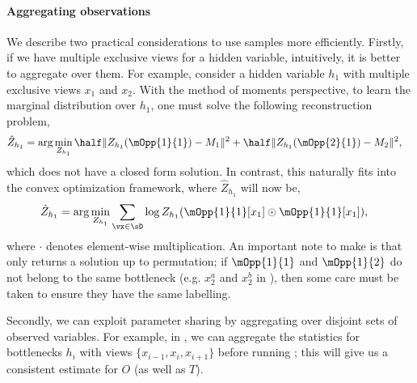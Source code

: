 

\paragraph{Aggregating observations}
We describe two practical considerations to use samples more efficiently.
Firstly, if we have multiple exclusive views for a hidden variable,
  intuitively, it is better to aggregate over them. 
For example, consider a hidden variable $h_1$ with multiple exclusive
  views $x_1$ and $x_2$.
With the method of moments perspective, to learn the marginal
  distribution over $h_1$, one must solve the following reconstruction
  problem, 
\begin{align*}
  \hat Z_{h_1} &= \arg\min_{Z_{h_1}} \half \|Z_{h_1}(\mOpp{1}{1}) - M_1 \|^2 + \half \|Z_{h_1}(\mOpp{2}{1}) - M_2 \|^2,
\end{align*}
which does not have a closed form solution. 
In contrast, this naturally fits into the convex optimization framework, where $\hat Z_{h_1}$ will now be,
\begin{align*}
  \hat Z_{h_1} &= \arg\min_{Z_{h_1}} \sum_{\vx \in \sD} \log Z_{h_1}( \mOpp{1}{1}[x_1] \odot \mOpp{1}{1}[x_1] ),
\end{align*}
where $\cdot$ denotes element-wise multiplication.
An important note to make is that \TensorFactorize only returns
  a solution up to permutation; if $\mOpp{1}{1}$ and
  $\mOpp{1}{2}$ do not belong to the same bottleneck (e.g. $x^a_2$ and
  $x^b_2$ in ), then some
  care must be taken to ensure they have the same labelling.

Secondly, we can exploit parameter sharing by aggregating over
  disjoint sets of observed variables. 
For example, in , we can aggregate the statistics for
  bottlenecks $h_i$ with views $\{x_{i-1}, x_{i}, x_{i+1}\}$ before
  running \TensorFactorize; this will give us a consistent estimate for
  $O$ (as well as $T$).

